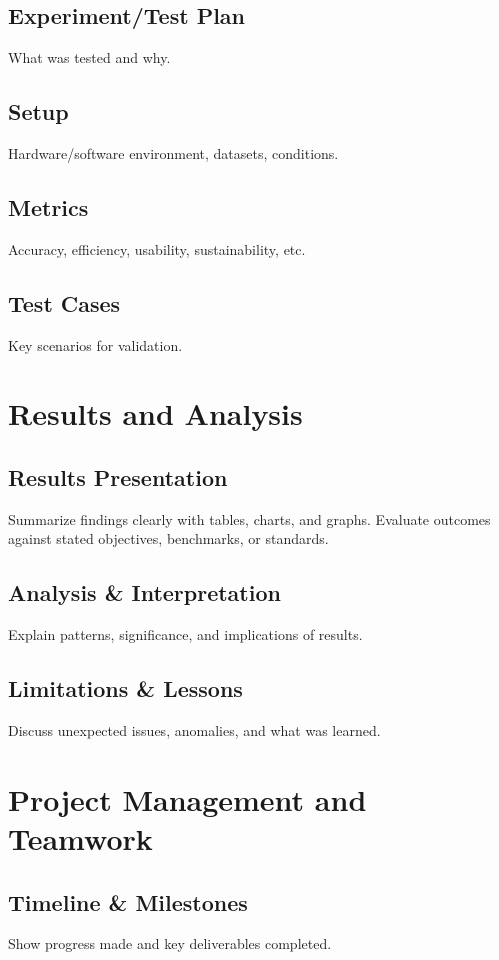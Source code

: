 \documentclass[12pt]{article}
\begin{document}
\subsection{Experiment/Test Plan}
What was tested and why.

\subsection{Setup}
Hardware/software environment, datasets, conditions.

\subsection{Metrics}
Accuracy, efficiency, usability, sustainability, etc.

\subsection{Test Cases}
Key scenarios for validation.

\section{Results and Analysis}

\subsection{Results Presentation}
Summarize findings clearly with tables, charts, and graphs. Evaluate outcomes against stated objectives, benchmarks, or standards.

\subsection{Analysis \& Interpretation}
Explain patterns, significance, and implications of results.

\subsection{Limitations \& Lessons}
Discuss unexpected issues, anomalies, and what was learned.

\section{Project Management and Teamwork}

\subsection{Timeline \& Milestones}
Show progress made and key deliverables completed.
\end{document}
